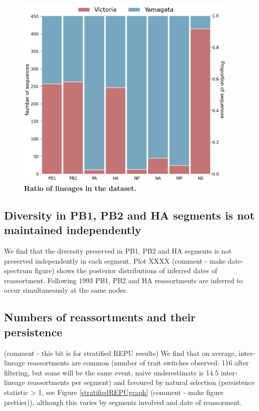 \documentclass[11pt,oneside,letterpaper]{article}
\begin{document}
\begin{figure}[h]
	\centering		
	\includegraphics[width=0.95\textwidth]{figures/InfB_LineageRatios.png}
	\caption{\textbf{Ratio of lineages in the dataset.}}
	\label{lineageRatios}
\end{figure}

\subsection*{Diversity in PB1, PB2 and HA segments is not maintained independently}
We find that the diversity preserved in PB1, PB2 and HA segments is not preserved independently in each segment.
Plot XXXX (comment - make date-spectrum figure) shows the posterior distributions of inferred dates of reassortment.
Following 1993 PB1, PB2 and HA reassortments are inferred to occur simultaneously at the same nodes.


\subsection*{Numbers of reassortments and their persistence}

(comment - this bit is for stratified REPU results)
We find that on average, inter-lineage reassortments are common (number of trait switches observed: 116 after filtering, but some will be the same event, naive underestimate is 14.5 inter-lineage reassortments per segment) and favoured by natural selection (persistence statistic > 1, see Figure \ref{stratifiedREPUgraph} (comment - make figure prettier)), although this varies by segments involved and date of reassorment.
\end{document}

